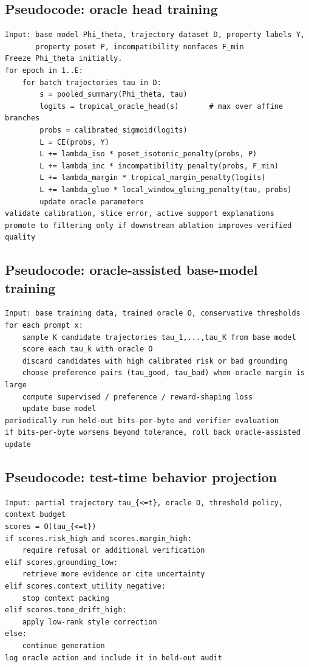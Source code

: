 \documentclass[11pt]{article}
\theoremstyle{definition}
\theoremstyle{remark}
\numberwithin{equation}{section}
\begin{document}
\subsection{Pseudocode: oracle head training}

\begin{Verbatim}[fontsize=\small,frame=single]
Input: base model Phi_theta, trajectory dataset D, property labels Y,
       property poset P, incompatibility nonfaces F_min
Freeze Phi_theta initially.
for epoch in 1..E:
    for batch trajectories tau in D:
        s = pooled_summary(Phi_theta, tau)
        logits = tropical_oracle_head(s)       # max over affine branches
        probs = calibrated_sigmoid(logits)
        L = CE(probs, Y)
        L += lambda_iso * poset_isotonic_penalty(probs, P)
        L += lambda_inc * incompatibility_penalty(probs, F_min)
        L += lambda_margin * tropical_margin_penalty(logits)
        L += lambda_glue * local_window_gluing_penalty(tau, probs)
        update oracle parameters
validate calibration, slice error, active support explanations
promote to filtering only if downstream ablation improves verified quality
\end{Verbatim}

\subsection{Pseudocode: oracle-assisted base-model training}

\begin{Verbatim}[fontsize=\small,frame=single]
Input: base training data, trained oracle O, conservative thresholds
for each prompt x:
    sample K candidate trajectories tau_1,...,tau_K from base model
    score each tau_k with oracle O
    discard candidates with high calibrated risk or bad grounding
    choose preference pairs (tau_good, tau_bad) when oracle margin is large
    compute supervised / preference / reward-shaping loss
    update base model
periodically run held-out bits-per-byte and verifier evaluation
if bits-per-byte worsens beyond tolerance, roll back oracle-assisted update
\end{Verbatim}

\subsection{Pseudocode: test-time behavior projection}

\begin{Verbatim}[fontsize=\small,frame=single]
Input: partial trajectory tau_{<=t}, oracle O, threshold policy, context budget
scores = O(tau_{<=t})
if scores.risk_high and scores.margin_high:
    require refusal or additional verification
elif scores.grounding_low:
    retrieve more evidence or cite uncertainty
elif scores.context_utility_negative:
    stop context packing
elif scores.tone_drift_high:
    apply low-rank style correction
else:
    continue generation
log oracle action and include it in held-out audit
\end{Verbatim}
\end{document}
